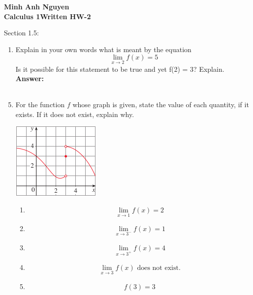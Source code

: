 \documentclass[12pt]{article}
\begin{document}
\textbf{Minh Anh Nguyen }\\
\textbf{Calculus 1\hfill Written HW-2}

\hrulefill

Section 1.5:

\begin{enumerate}

\item 
Explain in your own words what is meant by the equation
    \[ \lim_{x \to 2 } f(x) = 5\]
Is it possible for this statement to be true and yet f(2) = 3? Explain.\\
  \textbf{Answer:} \\~\\
  \noindent{}
  
\end{enumerate}

\begin{enumerate}
\setcounter{enumi}{4}
    \item For the function $f$ whose graph is given, state the value of each quantity, if it exists. If it does not exist, explain why.
    \begin{center}
    \includegraphics{Images/Image-0.png}
    \end{center}
    \begin{enumerate}
        \item \[ \boxed{\lim_{x \to 1} f(x) = 2}\]
        \item \[ \boxed{\lim_{x \to 3^-} f(x) = 1}\]
        \item \[ \boxed{\lim_{x \to 3^+} f(x) = 4}\]
        \item \[ \boxed{\lim_{x \to 3} f(x) \text{ does not exist.}}\]
        \item \[ \boxed{f(3) = 3}\]
    \end{enumerate}
\end{enumerate}
\end{document}
